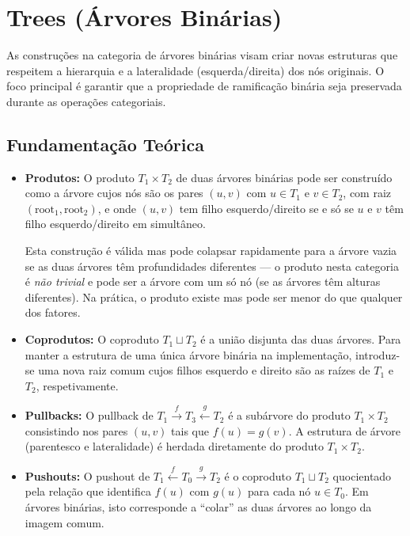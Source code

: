 \section{Trees (Árvores Binárias)}
\label{sec:const-trees}

As construções na categoria de árvores binárias visam criar novas estruturas que respeitem a hierarquia e a lateralidade (esquerda/direita) dos nós originais. O foco principal é garantir que a propriedade de ramificação binária seja preservada durante as operações categoriais.

\subsection{Fundamentação Teórica}

\begin{itemize}
    \item \textbf{Produtos:} 
    O produto $T_1 \times T_2$ de duas árvores binárias pode ser construído como a árvore cujos nós são os pares $(u, v)$ com $u \in T_1$ e $v \in T_2$, com raiz $(\text{root}_1, \text{root}_2)$, e onde $(u,v)$ tem filho esquerdo/direito se e só se $u$ e $v$ têm filho esquerdo/direito em simultâneo.
    
    Esta construção é válida mas pode colapsar rapidamente para a árvore vazia se as duas árvores têm profundidades diferentes --- o produto nesta categoria é \emph{não trivial} e pode ser a árvore com um só nó (se as árvores têm alturas diferentes). Na prática, o produto existe mas pode ser menor do que qualquer dos fatores.

    \item \textbf{Coprodutos:} O coproduto $T_1 \sqcup T_2$ é a união disjunta das duas árvores. Para manter a estrutura de uma única árvore binária na implementação, introduz-se uma nova raiz comum cujos filhos esquerdo e direito são as raízes de $T_1$ e $T_2$, respetivamente.

    \item \textbf{Pullbacks:} O pullback de $T_1 \xrightarrow{f} T_3 \xleftarrow{g} T_2$ é a subárvore do produto $T_1 \times T_2$ consistindo nos pares $(u, v)$ tais que $f(u) = g(v)$. A estrutura de árvore (parentesco e lateralidade) é herdada diretamente do produto $T_1 \times T_2$.

    \item \textbf{Pushouts:} O pushout de $T_1 \xleftarrow{f} T_0 \xrightarrow{g} T_2$ é o coproduto $T_1 \sqcup T_2$ quocientado pela relação que identifica $f(u)$ com $g(u)$ para cada nó $u \in T_0$. Em árvores binárias, isto corresponde a ``colar'' as duas árvores ao longo da imagem comum.


\end{itemize}
